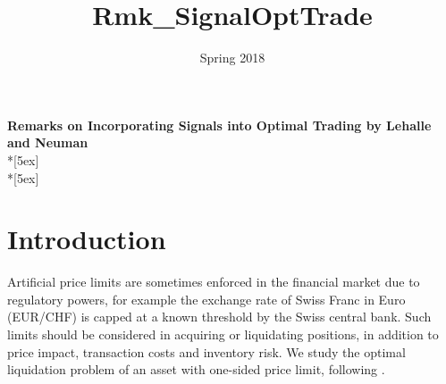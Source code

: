 \documentclass[openany,oneside]{article}
\title{Rmk_SignalOptTrade}
\date{Spring 2018}
\theoremstyle{definition}
\theoremstyle{remark}
\begin{document}
\begin{center}	
	\textbf{\Large Remarks on Incorporating Signals into Optimal Trading by Lehalle and Neuman} \\*[5ex]
    \thedate \\*[5ex]
\end{center}


\section{Introduction}
Artificial price limits are sometimes enforced in the financial market due to regulatory powers, for example the exchange rate of Swiss Franc in Euro (EUR/CHF) is capped at a known threshold by the Swiss central bank. Such limits should be considered in acquiring or liquidating positions, in addition to price impact, transaction costs and inventory risk. We study the optimal liquidation problem of an asset with one-sided price limit, following \cite{lehalle2017incorporating}.


\end{document}
